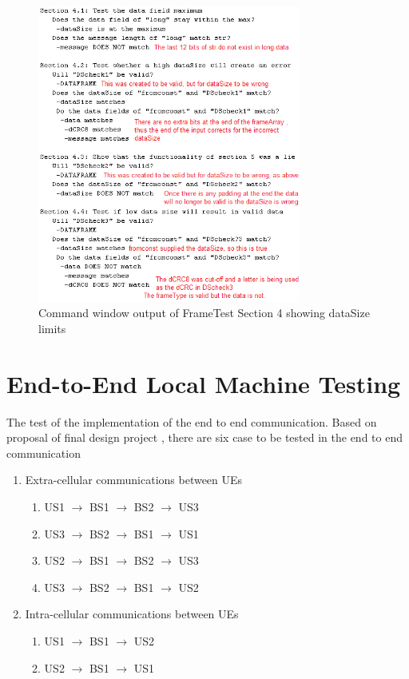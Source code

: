 \begin{figure}[p]
    \includegraphics[width=0.77\textwidth, left]{FrameTest4.PNG}
    \caption{Command window output of FrameTest Section 4 showing dataSize limits  }
    \label{fig:FrameTest4}
\end{figure}


\section{End-to-End Local Machine Testing }
The test of the implementation of the end to end communication.
Based on proposal of final design project \cite{cdproj}, there
are six case to be tested in the end to end communication
\begin{enumerate}
  \item Extra-cellular communications between UEs
  \begin{enumerate}
    \item US1 $\rightarrow$ BS1 $\rightarrow$ BS2 $\rightarrow$ US3
    \item US3 $\rightarrow$ BS2 $\rightarrow$ BS1 $\rightarrow$ US1
		\item US2 $\rightarrow$ BS1 $\rightarrow$ BS2 $\rightarrow$ US3
		\item US3 $\rightarrow$ BS2 $\rightarrow$ BS1 $\rightarrow$ US2
  \end{enumerate}
  \item Intra-cellular communications between UEs
	  \begin{enumerate}
    \item US1 $\rightarrow$ BS1 $\rightarrow$ US2
    \item US2 $\rightarrow$ BS1 $\rightarrow$ US1
	\end{enumerate}
\end{enumerate}

